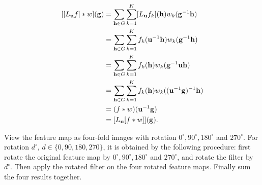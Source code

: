 \begin{equation}
\begin{split}
[[L_{\mathbf{u}} f] * w]({\mathbf{g}})
    & = \sum_{{\mathbf{h}}\in G}\sum_{k=1}^K [L_{\mathbf{u}} f_k]({\mathbf{h}}) w_k({\mathbf{g}}^{-1} {\mathbf{h}})  \\
    & = \sum_{{\mathbf{h}}\in G}\sum_{k=1}^K f_k({\mathbf{u}}^{-1}{\mathbf{h}}) w_k({\mathbf{g}}^{-1} {\mathbf{h}})  \\
    & = \sum_{{\mathbf{h}}\in G}\sum_{k=1}^K f_k({\mathbf{h}}) w_k({\mathbf{g}}^{-1} {\mathbf{u}} {\mathbf{h}})  \\
    & = \sum_{{\mathbf{h}}\in G}\sum_{k=1}^K f_k({\mathbf{h}}) w_k(({\mathbf{u}}^{-1}{\mathbf{g}})^{-1} {\mathbf{h}})  \\
    & = (f * w) ({\mathbf{u}}^{-1} {\mathbf{g}}) \\
    & = [L_{\mathbf{u}}[ f * w]]({\mathbf{g}}).
\end{split}
\end{equation}

View the feature map as four-fold images with rotation
$0^{\circ}, 90^{\circ}, 180^{\circ}$ and  $270^{\circ}$.
For rotation $d^{\circ}$, $d\in \{0,90,180,270\}$,
it is obtained by the following procedure:
first rotate the original feature map by
$0^{\circ}, 90^{\circ}, 180^{\circ}$ and  $270^{\circ}$,
and rotate the filter by  $d^{\circ}$.
Then apply the rotated filter on the four rotated feature maps.
Finally sum the four results together.
